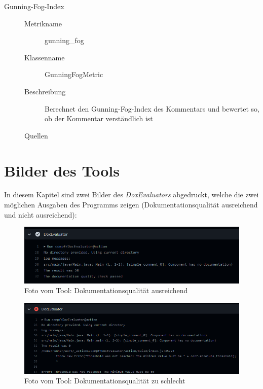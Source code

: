 \begin{appendices}
\begin{description}
\item[Gunning-Fog-Index]
\begin{description}
\item[]
    \item [Metrikname]  gunning\_fog
    \item [Klassenname] GunningFogMetric
    \item[Beschreibung] Berechnet den Gunning-Fog-Index des Kommentars und bewertet so, ob der Kommentar verständlich ist
     \item[Quellen] \cite[S. 71]{AutomaticQualityAssessmentofSourceCodeComments:TheJavadocMiner}
\end{description}
 \end{description}

\chapter{Bilder des Tools}\label{chapter:pictures_tool}
In diesem Kapitel sind zwei Bilder des \textit{DoxEvaluators} abgedruckt, welche die zwei möglichen Ausgaben des Programms zeigen (Dokumentationsqualität ausreichend und nicht ausreichend):
\begin{figure}[htbp!]
    \centering
    \includegraphics[width=\columnwidth]{figures/appendix/passed.png}
    \caption{Foto vom Tool: Dokumentationsqualität ausreichend}
    \label{fig:passed}
\end{figure}
\begin{figure}[htbp!]
    \centering
    \includegraphics[width=\columnwidth]{figures/appendix/absolute_threshold.png}
    \caption{Foto vom Tool: Dokumentationsqualität zu schlecht}
    \label{fig:absolute}
\end{figure}

\end{appendices}
	
